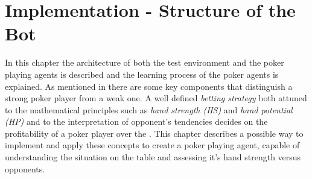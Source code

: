 
\chapter{Implementation - Structure of the Bot}
\label{cha:implementation}
In this chapter the architecture of both the test environment and the poker playing agents is described and the learning process of the poker agents is explained. As mentioned in  there are some key components that distinguish a strong poker player from a weak one. A well defined \textit{betting strategy} both attuned to the mathematical principles such as \textit{hand strength (HS)} and \textit{hand potential (HP)} and to the interpretation of opponent's tendencies decides on the profitability of a poker player over the  \cite{opp_modeling}. This chapter describes a possible way to implement and apply these concepts to create a poker playing agent, capable of understanding the situation on the table and assessing it's hand strength versus opponents. 

